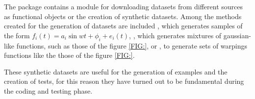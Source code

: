
The package contains a module for downloading datasets from different sources
as functional objects or the creation of synthetic datasets.
Among the methods created for the generation of datasets are included
, which generates samples of the form
$f_i(t)=a_i\sin{wt + \phi_i} + e_i(t)$,
, which generates mixtures of gaussian-like
functions, such as those of the figure \ref{FIG:},
 or , to generate sets of warpings functions like the
 those of the figure \ref{FIG:}.


 These synthetic datasets are useful for the generation of examples and the
 creation of tests, for this reason they have turned out to be fundamental
 during the coding and testing phase.
